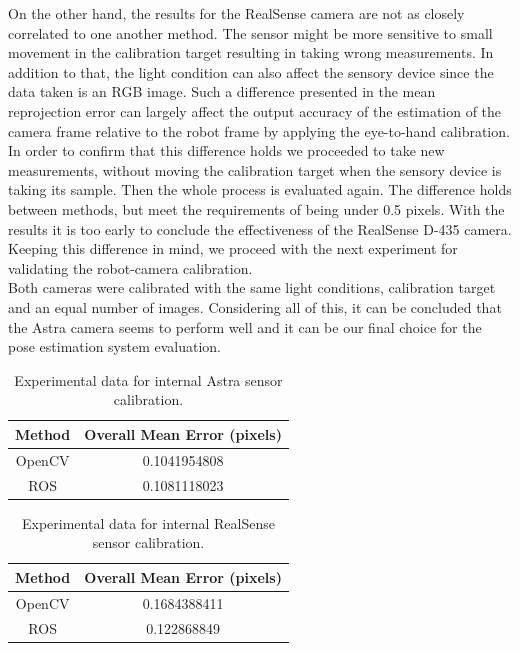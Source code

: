 On the other hand, the results for the RealSense camera are not as closely correlated to one another method. The sensor might be more sensitive to small movement in the calibration target resulting in taking wrong measurements. In addition to that, the light condition can also affect the sensory device since the data taken is an RGB image. Such a difference presented in the mean reprojection error can largely affect the output accuracy of the estimation of the camera frame relative to the robot frame by applying the eye-to-hand calibration. In order to confirm that this difference holds we proceeded to take new measurements, without moving the calibration target when the sensory device is taking its sample. Then the whole process is evaluated again. The difference holds between methods, but meet the requirements of being under 0.5 pixels. With the results it is too early to conclude the effectiveness of the RealSense D-435 camera. Keeping this difference in mind, we proceed with the next experiment for validating the robot-camera calibration.  \\
Both cameras were calibrated with the same light conditions, calibration target and an equal number of images. Considering all of this, it can be concluded that the Astra camera seems to perform well and it can be our final choice for the pose estimation system evaluation. 

\begin{table}[ht]
\renewcommand{\arraystretch}{1.3}
\caption{Experimental data for internal Astra sensor calibration.}
\label{astra1}
\centering
\begin{tabular}{|c||c|}
\hline
Method & Overall Mean Error (pixels)\\
\hline
OpenCV &  0.1041954808\\
\hline
ROS &  0.1081118023\\
\hline
\end{tabular}
\end{table}

\begin{table}[ht]
\renewcommand{\arraystretch}{1.3}
\caption{Experimental data for internal RealSense sensor calibration.}
\label{real1}
\centering
\begin{tabular}{|c||c|}
\hline
Method & Overall Mean Error (pixels)\\
\hline
OpenCV &  0.1684388411\\
\hline
ROS &  0.122868849\\
\hline
\end{tabular}
\end{table}

